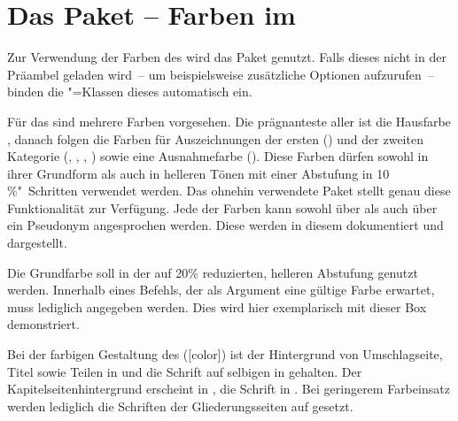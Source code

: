 \section{Das Paket  -- Farben im \CD}%
\begin{Declaration*}{}
%
%
Zur Verwendung der Farben des \CDs wird das Paket  
genutzt. Falls dieses nicht in der Präambel geladen wird~-- um beispielsweise 
zusätzliche Optionen aufzurufen~-- binden die \TUDScript"=Klassen dieses 
automatisch ein.

Für das \CD sind mehrere Farben vorgesehen. Die prägnanteste aller ist die 
Hausfarbe , danach folgen die Farben für Auszeichnungen der ersten
() und der zweiten Kategorie (, , 
, ) sowie eine Ausnahmefarbe (). 
Diese Farben dürfen sowohl in ihrer Grundform als auch in helleren Tönen mit 
einer Abstufung in 10\,\%"~Schritten verwendet werden. Das ohnehin verwendete 
Paket  stellt genau diese Funktionalität zur Verfügung. Jede 
der Farben kann sowohl über  als auch über ein 
Pseudonym  angesprochen werden. Diese werden in diesem 
\autorefname dokumentiert und dargestellt.
%
\begin{Example*}
Die Grundfarbe  soll in der auf 20\% reduzierten, helleren 
Abstufung genutzt werden. Innerhalb eines Befehls, der als Argument eine 
gültige Farbe erwartet, muss lediglich  angegeben 
werden. Dies wird hier exemplarisch mit dieser \colorbox{HKS44!20}{%
  Box %
} demonstriert.
\end{Example*}
%
Bei der farbigen Gestaltung des \CDs ([color]) ist der Hintergrund 
von Umschlagseite, Titel sowie Teilen in  und die Schrift auf 
selbigen in  gehalten. Der Kapitelseitenhintergrund
erscheint in , die Schrift in . Bei 
geringerem Farbeinsatz werden lediglich die Schriften der Gliederungsseiten auf 
 gesetzt.


\end{Declaration*}

